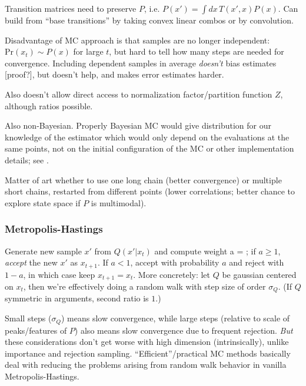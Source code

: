 \documentclass[notitlepage,openany,11pt]{report}
\theoremstyle{plain}%
\numberwithin{equation}{section}
\begin{document}
Transition matrices need to preserve $P$, i.e. $P(x') = \int \! dx \, T(x', x) P(x)$. Can build from ``base transitions'' by taking convex linear combos or by convolution. 

Disadvantage of MC approach is that samples are no longer independent: $\text{Pr}(x_t) \sim P(x)$ for large $t$, but hard to tell how many steps are needed for convergence. Including dependent samples in average \emph{doesn't} bias estimates [proof?], but doesn't help, and makes error estimates harder.

Also doesn't allow direct access to normalization factor/partition function $Z$, although ratios possible.

Also non-Bayesian. Properly Bayesian MC would give distribution for our knowledge of the estimator which would only depend on the evaluations at the same points, not on the initial configuration of the MC or other implementation details; see \citep{GhahramaniRasmussen:03}.

Matter of art whether to use one long chain (better convergence) or multiple short chains, restarted from different points (lower correlations; better chance to explore state space if $P$ is multimodal). 

\subsubsection{Metropolis-Hastings}
Generate new sample $x'$ from $Q(x' | x_t)$ and compute weight
\be
a =  ;
\ee
if $a \geq 1$, \emph{accept} the new $x'$ as $x_{t+1}$. If $a < 1$, accept with probability $a$ and reject with $1-a$, in which case keep $x_{t+1} = x_{t}.$ 
More concretely: let $Q$ be gaussian centered on $x_t$, then we're effectively doing a random walk with step size of order $\sigma_{Q}$. (If $Q$ symmetric in arguments, second ratio is $1$.)

Small steps ($\sigma_{Q}$) means slow convergence, while large steps (relative to scale of peaks/features of $P$) also means slow convergence due to frequent rejection.  \emph{But} these considerations don't get worse with high dimension (intrinsically), unlike importance and rejection sampling. ``Efficient''/practical MC methods basically deal with reducing the problems arising from random walk behavior in vanilla Metropolis-Hastings.
\end{document}
